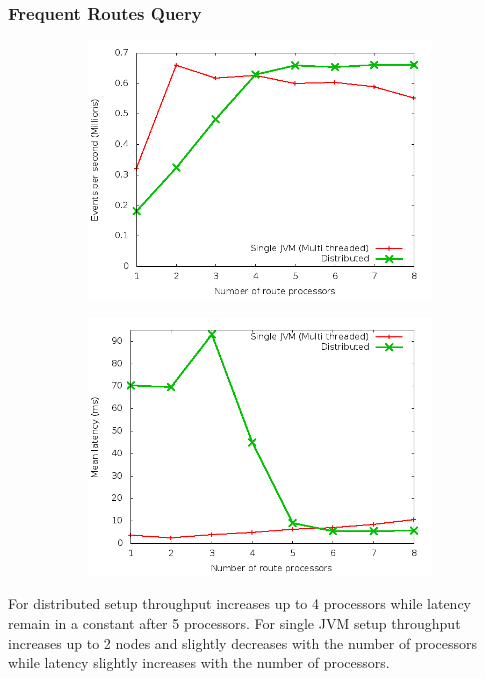 \documentclass{beamer}
\begin{document}
\begin{frame}
\frametitle{Frequent Routes Query}

\begin{figure}
        \centering
        \begin{subfigure}[b]{0.45\textwidth}
                \includegraphics[width=\textwidth]{throughput_route.png}
        \end{subfigure}
        \begin{subfigure}[b]{0.45\textwidth}
                \includegraphics[width=\textwidth]{latency_route.png}
        \end{subfigure}
\end{figure}

\footnotesize For distributed setup throughput increases up to 4 processors while latency remain in a constant after 5 processors. For single JVM setup throughput increases up to 2 nodes and slightly decreases with the number of processors while latency slightly increases with the number of processors.
 

\end{frame}
\end{document}
